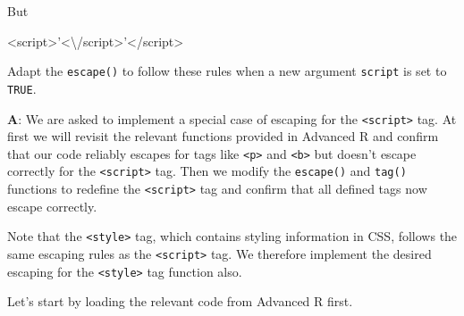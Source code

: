 \documentclass[
]{krantz}
\makeatletter
\newenvironment{Shaded}{\begin{snugshade}}{\end{snugshade}}
\newcommand{\KeywordTok}[1]{\textcolor[rgb]{0.13,0.29,0.53}{\textbf{#1}}}
\newcommand{\SpecialCharTok}[1]{\textcolor[rgb]{0.00,0.00,0.00}{#1}}
\newcommand{\StringTok}[1]{\textcolor[rgb]{0.31,0.60,0.02}{#1}}
\newenvironment{kframe}{%
\medskip{}
\setlength{\fboxsep}{.8em}
 \def\at@end@of@kframe{}%
 \ifinner\ifhmode%
  \def\at@end@of@kframe{\end{minipage}}%
  \begin{minipage}{\columnwidth}%
 \fi\fi%
 \def\FrameCommand##1{\hskip\@totalleftmargin \hskip-\fboxsep
 \colorbox{shadecolor}{##1}\hskip-\fboxsep
     \hskip-\linewidth \hskip-\@totalleftmargin \hskip\columnwidth}%
 \MakeFramed {\advance\hsize-\width
   \@totalleftmargin\z@ \linewidth\hsize
   \@setminipage}}%
 {\par\unskip\endMakeFramed%
 \at@end@of@kframe}
\renewenvironment{Shaded}{\begin{kframe}}{\end{kframe}}
\renewcommand{\KeywordTok} [1]{\textcolor[rgb]{0.00,0.44,0.13}{{#1}}}
\renewcommand{\StringTok}  [1]{\textcolor[rgb]{0.25,0.44,0.63}{{#1}}}
\makeatother
\begin{document}
But

\begin{Shaded}
\begin{Highlighting}[]
\KeywordTok{<script>}\StringTok{'<}\SpecialCharTok{\textbackslash{}/}\StringTok{script>'}\KeywordTok{</script>}
\end{Highlighting}
\end{Shaded}

Adapt the \texttt{escape()} to follow these rules when a new argument \texttt{script} is set to \texttt{TRUE}.

\textbf{{A}}: We are asked to implement a special case of escaping for the \texttt{\textless{}script\textgreater{}} tag. At first we will revisit the relevant functions provided in Advanced R and confirm that our code reliably escapes for tags like \texttt{\textless{}p\textgreater{}} and \texttt{\textless{}b\textgreater{}} but doesn't escape correctly for the \texttt{\textless{}script\textgreater{}} tag. Then we modify the \texttt{escape()} and \texttt{tag()} functions to redefine the \texttt{\textless{}script\textgreater{}} tag and confirm that all defined tags now escape correctly.

Note that the \texttt{\textless{}style\textgreater{}} tag, which contains styling information in CSS, follows the same escaping rules as the \texttt{\textless{}script\textgreater{}} tag. We therefore implement the desired escaping for the \texttt{\textless{}style\textgreater{}} tag function also.

Let's start by loading the relevant code from Advanced R first.
\end{document}
